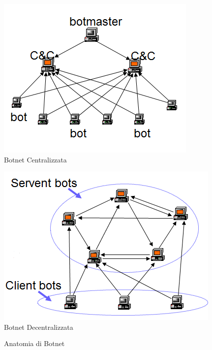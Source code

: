 \begin{figure}[hbp] 
  \begin{minipage}[b]{0.5\linewidth}
    \centering
    \includegraphics[width=\linewidth]{figures/botnet.png} \\ 
    Botnet Centralizzata
    \vspace{4ex}
  \end{minipage}%
  \begin{minipage}[b]{0.5\linewidth}
    \centering
    \includegraphics[width=\linewidth]{figures/botnetp2p.png} \\
    Botnet Decentralizzata 
    \vspace{4ex}
  \end{minipage} 
     \caption{Anatomia di Botnet\label{fig:botnet} }
\end{figure}

